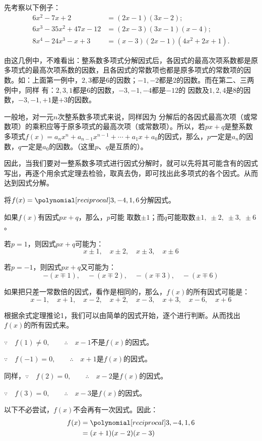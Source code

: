 先考察以下例子：
\[\begin{split}
    6x^2-7x+2&= (2x-1) (3x-2);\\
6x^3-35x^2+47x-12&= (2x-3) (3x-1)(x-4);\\
8x^4-24x^3-x+3&= (x-3) (2x-1)(4x^2+2x+1) .
\end{split}\]

由这几例中，不难看出：整系数多项式分解因式后，各因式的最高次项系数都是原多项式的最高次项系数的因数，且各因式的常数项也都是原多项式的常数项的因数。如：上面第一例中，$2, 3$都是6的因数；$-1,-2$都是2的因数。而在第二、三两例中，同样
有：$2, 3, 1$都是6的因数，$-3,-1,-4$都是$-12$的
因数及$1, 2, 4$是8的因数，$-3,-1,+1$是$+3$的因数。

一般地，对一元$n$次整系数多项式来说，同样因为
分解后的各因式最高次项（或常数项）的乘积应等于原多项式的最高次项（或常数项）。所以，若$px+q$是整系数多项式$f(x)=a_nx^n+a_{n-1}x^{n-1}+\cdots +a_1x+a_0$的因式，那么，$p$一定是$a_n$的因数，$q$一定是$a_0$的因数。（这里$p$、$q$是互质的）。

因此，当我们要对一整系数多项式进行因式分解时，就可以先将其可能含有的因式写出，再逐个用余式定理去检验，取真去伪，即可找出此多项式的各个因式。从而达到因式分解。


\begin{example}
    将$f(x)=\poly{3,-4,1,6}$分解因式。
\end{example}

\begin{analyze}
    如果$f(x)$有因式$px+q$，那么，$p$可能
取数$\pm1$；而$q$可能取数$\pm1,\;\pm2,\;\pm3,\;\pm6$。

若$p=1$，则因式$px+q$可能为：
\[x\pm1,\quad x\pm2,\quad x\pm3,\quad x\pm6\]

若$p=-1$，则因式$px+q$又可能为：
\[- (x\mp 1) ,\quad - (x\mp 2) ,\quad - (x\mp 3) ,\quad -(x\mp 6)\]

如果把只差一常数倍的因式，看作是相同的，那么，$f(x)$的所有因式可能是：
\[x-1,\quad x+1, \quad x-2,\quad x+2,\quad x-3,\quad x+3,\quad x-6,\quad x+6\]

根据余式定理推论1，我们可以由简单的因式开始，逐个进行判断。从而找出$f(x)$的所有因式来。    
\end{analyze}


\begin{solution}
$\because\quad f(1)\ne 0,\qquad \therefore\quad x-1$不是$f(x)$的因式。

$\because\quad f(-1)= 0,\qquad \therefore\quad x+1$是$f(x)$的因式。

同样，$\because\quad f(2)= 0,\qquad \therefore\quad x-2$是$f(x)$的因式。

$\because\quad f(3)= 0,\qquad \therefore\quad x-3$是$f(x)$的因式。

以下不必尝试，$f(x)$不会再有一次因式。因此：
\[\begin{split}
 f(x)&=\poly{3,-4,1,6}\\
 &=(x+1)(x-2)(x-3)   
\end{split}\]
\end{solution}

